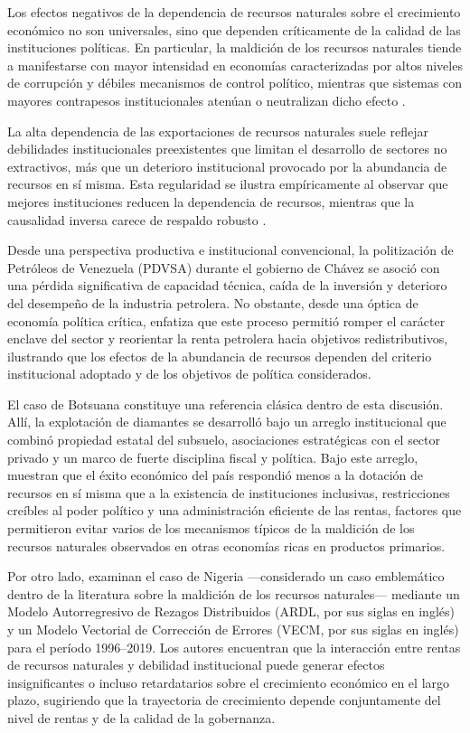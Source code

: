 \documentclass[../../TFM.tex]{subfiles}
\begin{document}
	Los efectos negativos de la dependencia de recursos naturales sobre el crecimiento económico no son universales, sino que dependen críticamente de la calidad de las instituciones políticas. En particular, la maldición de los recursos naturales tiende a manifestarse con mayor intensidad en economías caracterizadas por altos niveles de corrupción y débiles mecanismos de control político, mientras que sistemas con mayores contrapesos institucionales atenúan o neutralizan dicho efecto \parencite{Brckner2010}.
	
	La alta dependencia de las exportaciones de recursos naturales suele reflejar debilidades institucionales preexistentes que limitan el desarrollo de sectores no extractivos, más que un deterioro institucional provocado por la abundancia de recursos en sí misma. Esta regularidad se ilustra empíricamente al observar que mejores instituciones reducen la dependencia de recursos, mientras que la causalidad inversa carece de respaldo robusto \parencite{Brunnschweiler2008}.
	
	Desde una perspectiva productiva e institucional convencional, la politización de Petróleos de Venezuela (PDVSA) durante el gobierno de Chávez se asoció con una pérdida significativa de capacidad técnica, caída de la inversión y deterioro del desempeño de la industria petrolera. No obstante, desde una óptica de economía política crítica, \textcite{Hammond2011} enfatiza que este proceso permitió romper el carácter enclave del sector y reorientar la renta petrolera hacia objetivos redistributivos, ilustrando que los efectos de la abundancia de recursos dependen del criterio institucional adoptado y de los objetivos de política considerados.
	
	El caso de Botsuana constituye una referencia clásica dentro de esta discusión. Allí, la explotación de diamantes se desarrolló bajo un arreglo institucional que combinó propiedad estatal del subsuelo, asociaciones estratégicas con el sector privado y un marco de fuerte disciplina fiscal y política. Bajo este arreglo, \textcite{Acemoglu2001} muestran que el éxito económico del país respondió menos a la dotación de recursos en sí misma que a la existencia de instituciones inclusivas, restricciones creíbles al poder político y una administración eficiente de las rentas, factores que permitieron evitar varios de los mecanismos típicos de la maldición de los recursos naturales observados en otras economías ricas en productos primarios.
	
	Por otro lado, \textcite{Fagbemi2022} examinan el caso de Nigeria —considerado un caso emblemático dentro de la literatura sobre la maldición de los recursos naturales— mediante un Modelo Autorregresivo de Rezagos Distribuidos (ARDL, por sus siglas en inglés) y un Modelo Vectorial de Corrección de Errores (VECM, por sus siglas en inglés) para el período 1996–2019. Los autores encuentran que la interacción entre rentas de recursos naturales y debilidad institucional puede generar efectos insignificantes o incluso retardatarios sobre el crecimiento económico en el largo plazo, sugiriendo que la trayectoria de crecimiento depende conjuntamente del nivel de rentas y de la calidad de la gobernanza.
	
\end{document}
